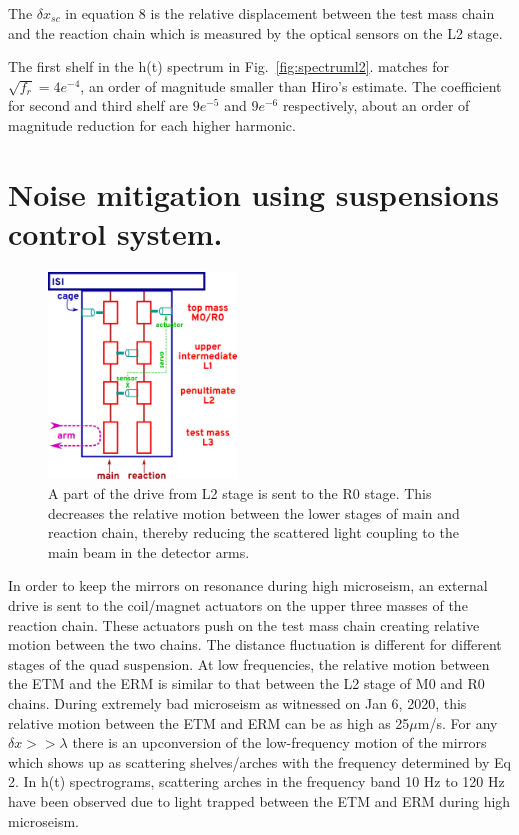 \documentclass[12pt]{iopart}
\begin{document}
The $\delta x_{sc} $ in equation 8 is the relative displacement between the test mass chain and the reaction chain which is measured by the optical sensors on the L2 stage. 

The first shelf in the h(t) spectrum in Fig.~\ref{fig:spectruml2}. matches for $\sqrt{f_{r}} = 4e^{-4}$, an order of magnitude smaller than Hiro's estimate\cite{hiro_calc}. The coefficient for second and third shelf are $9e^{-5}$ and $9e^{-6}$ respectively, about an order of magnitude reduction for each higher harmonic.

\qquad



\section{Noise mitigation using suspensions control system.} \label{rzero}
\quad
\begin{figure}[h]
    \centering
    \includegraphics[width=5cm]{R0trackingdiagram.png}
    \caption{A part of the drive from L2 stage is sent to the R0 stage. This decreases the relative motion between the lower stages of main and reaction chain, thereby reducing the scattered light coupling to the main beam in the detector arms.}
    \label{fig:r0tracking}
\end{figure}
In order to keep the mirrors on resonance during high microseism, an external drive is sent to the coil/magnet actuators on the upper three masses of the reaction chain. These actuators push on the test mass chain creating relative motion between the two chains. The distance fluctuation is different for different stages of the quad suspension. At low frequencies, the relative motion between the ETM and the ERM is similar to that between the L2 stage of M0 and R0 chains. During extremely bad microseism as witnessed on Jan 6, 2020, this relative motion between the ETM and ERM can be as high as 25${\mu}$m/s. For any ${\delta}x >> {\lambda}$ there is an upconversion of the low-frequency motion of the mirrors which shows up as scattering shelves/arches with the frequency determined by Eq 2. In h(t) spectrograms, scattering arches in the frequency band 10 Hz to 120 Hz have been observed due to light trapped between the ETM and ERM during high microseism.
\end{document}
